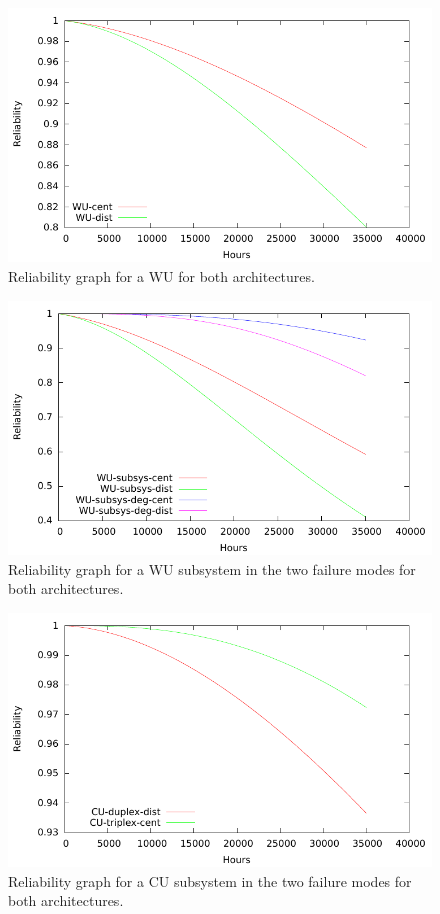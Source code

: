 \begin{figure}[H]
  \centering
  \includegraphics{plots/WU.pdf}
  \caption{Reliability graph for a WU for both architectures.}
  \label{fig:wu}
\end{figure}

\begin{figure}[H]
  \centering
  \includegraphics{plots/WUs.pdf}
  \caption{Reliability graph for a WU subsystem in the two failure modes for both architectures.}
  \label{fig:wus}
\end{figure}

\begin{figure}[H]
  \centering
  \includegraphics{plots/CUs.pdf}
  \caption{Reliability graph for a CU subsystem in the two failure modes for both architectures.}
  \label{fig:cu}
\end{figure}


